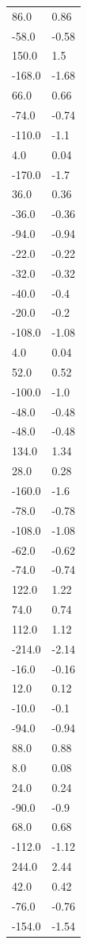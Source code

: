 \begin{longtable}{ll}
86.0 & 0.86 \\
-58.0 & -0.58 \\
150.0 & 1.5 \\
-168.0 & -1.68 \\
66.0 & 0.66 \\
-74.0 & -0.74 \\
-110.0 & -1.1 \\
4.0 & 0.04 \\
-170.0 & -1.7 \\
36.0 & 0.36 \\
-36.0 & -0.36 \\
-94.0 & -0.94 \\
-22.0 & -0.22 \\
-32.0 & -0.32 \\
-40.0 & -0.4 \\
-20.0 & -0.2 \\
-108.0 & -1.08 \\
4.0 & 0.04 \\
52.0 & 0.52 \\
-100.0 & -1.0 \\
-48.0 & -0.48 \\
-48.0 & -0.48 \\
134.0 & 1.34 \\
28.0 & 0.28 \\
-160.0 & -1.6 \\
-78.0 & -0.78 \\
-108.0 & -1.08 \\
-62.0 & -0.62 \\
-74.0 & -0.74 \\
122.0 & 1.22 \\
74.0 & 0.74 \\
112.0 & 1.12 \\
-214.0 & -2.14 \\
-16.0 & -0.16 \\
12.0 & 0.12 \\
-10.0 & -0.1 \\
-94.0 & -0.94 \\
88.0 & 0.88 \\
8.0 & 0.08 \\
24.0 & 0.24 \\
-90.0 & -0.9 \\
68.0 & 0.68 \\
-112.0 & -1.12 \\
244.0 & 2.44 \\
42.0 & 0.42 \\
-76.0 & -0.76 \\
-154.0 & -1.54 \\

\end{longtable}
